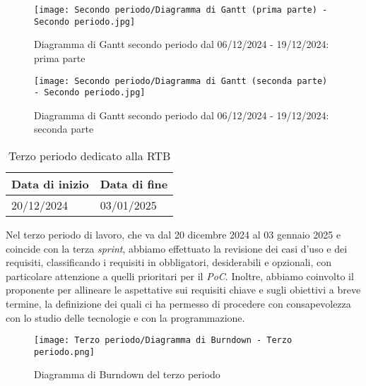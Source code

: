 \newpage

\begin{figure}[h] 
    \centering
    \texttt{[image: Secondo periodo/Diagramma di Gantt (prima parte) - Secondo periodo.jpg]}
    \caption{Diagramma di Gantt secondo periodo dal 06/12/2024 - 19/12/2024: prima parte} 
    \label{fig: Diagramma di Gantt primo periodo dal 06/12/2024 - 19/12/2024: prima parte}
\end{figure}

\newpage

\begin{figure}[h] 
    \centering
    \texttt{[image: Secondo periodo/Diagramma di Gantt (seconda parte) - Secondo periodo.jpg]}
    \caption{Diagramma di Gantt secondo periodo dal 06/12/2024 - 19/12/2024: seconda parte} 
    \label{fig: Diagramma di Gantt primo periodo dal 06/12/2024 - 19/12/2024: seconda parte}
\end{figure}

\newpage
{}
\label{sec:terzo periodo}
\begin{table}[h!]
    \centering
    \renewcommand{\arraystretch}{1.5} %
    \begin{tabularx}{\textwidth}{|X|X|}\hline
    \rowcolor[HTML]{FFD700} 
    \textbf{Data di inizio} & \textbf{Data di fine} \\ \hline
    20/12/2024 & 03/01/2025 \\ \hline
    \end{tabularx}
    \caption{Terzo periodo dedicato alla RTB}
\end{table}
Nel terzo periodo di lavoro, che va dal 20 dicembre 2024 al 03 gennaio 2025 e coincide con la terza \textit{sprint}, abbiamo effettuato la revisione dei casi d’uso e dei requisiti, classificando i requisiti in obbligatori, desiderabili e opzionali, con particolare attenzione a quelli prioritari per il \emph{PoC}. 
Inoltre, abbiamo coinvolto il proponente per allineare le aspettative sui requisiti chiave e sugli obiettivi a breve termine, la definizione dei quali ci ha permesso di procedere con consapevolezza con lo studio delle tecnologie e con la programmazione.\\

\newpage
\begin{figure}[h] 
    \centering
    \texttt{[image: Terzo periodo/Diagramma di Burndown - Terzo periodo.png]}
    \caption{Diagramma di Burndown del terzo periodo} 
    \label{fig: Diagramma di Burndown del terzo periodo}
\end{figure}

